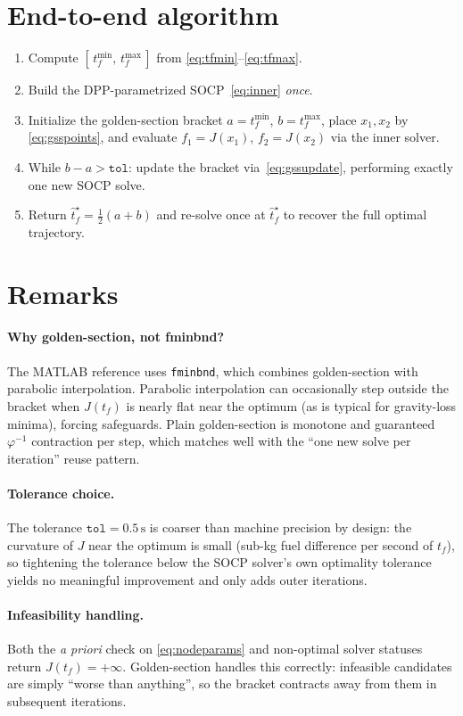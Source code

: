 \documentclass[11pt]{article}
\begin{document}
\section{End-to-end algorithm}

\begin{center}
\begin{minipage}{0.92\textwidth}
\begin{enumerate}
  \item Compute $[\,t_f^{\min},\,t_f^{\max}\,]$ from
        \eqref{eq:tfmin}--\eqref{eq:tfmax}.
  \item Build the DPP-parametrized SOCP~\eqref{eq:inner} \emph{once}.
  \item Initialize the golden-section bracket $a = t_f^{\min}$,
        $b = t_f^{\max}$, place $x_1, x_2$ by \eqref{eq:gsspoints}, and
        evaluate $f_1 = J(x_1)$, $f_2 = J(x_2)$ via the inner solver.
  \item While $b - a > \texttt{tol}$: update the bracket
        via~\eqref{eq:gssupdate}, performing exactly one new SOCP solve.
  \item Return $\hat t_f^\star = \tfrac{1}{2}(a + b)$ and re-solve once at
        $\hat t_f^\star$ to recover the full optimal trajectory.
\end{enumerate}
\end{minipage}
\end{center}

\section{Remarks}

\paragraph{Why golden-section, not fminbnd?} The MATLAB reference uses
\texttt{fminbnd}, which combines golden-section with parabolic interpolation.
Parabolic interpolation can occasionally step outside the bracket when
$J(t_f)$ is nearly flat near the optimum (as is typical for gravity-loss
minima), forcing safeguards. Plain golden-section is monotone and
guaranteed $\varphi^{-1}$ contraction per step, which matches well with the
``one new solve per iteration'' reuse pattern.

\paragraph{Tolerance choice.} The tolerance $\texttt{tol}=0.5\,\text{s}$ is
coarser than machine precision by design: the curvature of $J$ near the
optimum is small (sub-kg fuel difference per second of $t_f$), so tightening
the tolerance below the SOCP solver's own optimality tolerance yields no
meaningful improvement and only adds outer iterations.

\paragraph{Infeasibility handling.} Both the \emph{a priori}
check on \eqref{eq:nodeparams} and non-optimal solver statuses return
$J(t_f) = +\infty$. Golden-section handles this correctly: infeasible
candidates are simply ``worse than anything'', so the bracket contracts
away from them in subsequent iterations.
\end{document}
